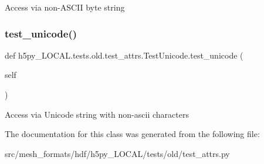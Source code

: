 \begin{DoxyVerb}Access via non-ASCII byte string \end{DoxyVerb}
 \mbox{\label{classh5py__LOCAL_1_1tests_1_1old_1_1test__attrs_1_1TestUnicode_a377e19245412a821912406c9d54c92cd}} 
\subsubsection{\texorpdfstring{test\+\_\+unicode()}{test\_unicode()}}
{\footnotesize\ttfamily def h5py\+\_\+\+L\+O\+C\+A\+L.\+tests.\+old.\+test\+\_\+attrs.\+Test\+Unicode.\+test\+\_\+unicode (\begin{DoxyParamCaption}\item[{}]{self }\end{DoxyParamCaption})}

\begin{DoxyVerb}Access via Unicode string with non-ascii characters \end{DoxyVerb}
 

The documentation for this class was generated from the following file\+:\begin{DoxyCompactItemize}
\item 
src/mesh\+\_\+formats/hdf/h5py\+\_\+\+L\+O\+C\+A\+L/tests/old/test\+\_\+attrs.\+py\end{DoxyCompactItemize}
